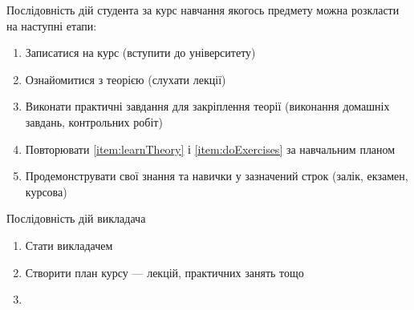 Послідовність дій студента за курс навчання якогось предмету можна розкласти
на наступні етапи:
\begin{enumerate}
    \item
        Записатися на курс (вступити до університету)
    \item\label{item:learnTheory}
        Ознайомитися з теорією (слухати лекції)
    \item\label{item:doExercises}
        Виконати практичні завдання для закріплення теорії
        (виконання домашніх завдань, контрольних робіт)
    \item
        Повторювати \ref{item:learnTheory} і \ref{item:doExercises} за
        навчальним планом
    \item
        Продемонструвати свої знання та навички у зазначений строк
        (залік, екзамен, курсова)
\end{enumerate}

Послідовність дій викладача
\begin{enumerate}
    \item
        Стати викладачем
    \item
        Створити план курсу --- лекцій, практичних занять тощо
    \item
\end{enumerate}
